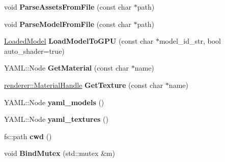 \begin{DoxyCompactItemize}
\item 
\mbox{\label{classnabla_1_1_asset_manager_ac006e5ed80a7aa65ed026b8d0db79d21}} 
void {\bfseries Parse\+Assets\+From\+File} (const char $\ast$path)
\item 
\mbox{\label{classnabla_1_1_asset_manager_a7cfb9db917ab4b569edc58fed45accde}} 
void {\bfseries Parse\+Model\+From\+File} (const char $\ast$path)
\item 
\mbox{\label{classnabla_1_1_asset_manager_a48f22924f5c97c0bd203a0cb9a454ab8}} 
\mbox{\hyperlink{structnabla_1_1_loaded_model}{Loaded\+Model}} {\bfseries Load\+Model\+To\+G\+PU} (const char $\ast$model\+\_\+id\+\_\+str, bool auto\+\_\+shader=true)
\item 
\mbox{\label{classnabla_1_1_asset_manager_a256cd978937a96b2f1461abcf7c13727}} 
Y\+A\+M\+L\+::\+Node {\bfseries Get\+Material} (const char $\ast$name)
\item 
\mbox{\label{classnabla_1_1_asset_manager_abc17bc6b206bab07bc3c0117fe8a56dc}} 
\mbox{\hyperlink{classnabla_1_1renderer_1_1_handle}{renderer\+::\+Material\+Handle}} {\bfseries Get\+Texture} (const char $\ast$name)
\item 
\mbox{\label{classnabla_1_1_asset_manager_ab79838b53cf333310b81a07d42e0dcb8}} 
Y\+A\+M\+L\+::\+Node {\bfseries yaml\+\_\+models} ()
\item 
\mbox{\label{classnabla_1_1_asset_manager_ae6afffe1a735aeda5596ab2c17ca95f0}} 
Y\+A\+M\+L\+::\+Node {\bfseries yaml\+\_\+textures} ()
\item 
\mbox{\label{classnabla_1_1_asset_manager_a3ccfd1a85e9024c258081e2877ccb935}} 
fs\+::path {\bfseries cwd} ()
\item 
\mbox{\label{classnabla_1_1_asset_manager_a9fe25228503b97e4e7c35ce0f40f36bd}} 
void {\bfseries Bind\+Mutex} (std\+::mutex \&m)
\end{DoxyCompactItemize}
